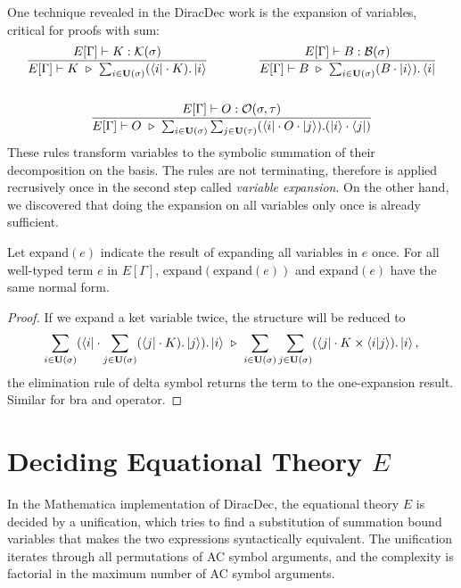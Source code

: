 \documentclass[runningheads]{llncs}
\begin{document}
One technique revealed in the DiracDec work is the expansion of variables, critical for proofs with sum:
\begin{gather*}
    \frac{E[\Gamma] \vdash K : \KType(\sigma)}{E[\Gamma] \vdash K \ \reduce\ \sum_{i \in \mathbf{U}(\sigma)}(\bra{i}\cdot K).\ket{i}}
    \qquad \qquad
    \frac{E[\Gamma] \vdash B : \BType(\sigma)}{E[\Gamma] \vdash B \ \reduce\ \sum_{i \in \mathbf{U}(\sigma)}(B \cdot \ket{i}).\bra{i}} \\
    \\
    \frac{E[\Gamma] \vdash O : \OType(\sigma, \tau)}{E[\Gamma] \vdash O \ \reduce\ \sum_{i \in \mathbf{U}(\sigma)} \sum_{j \in \mathbf{U}(\tau)}(\bra{i} \cdot O \cdot \ket{j}).(\ket{i} \cdot \bra{j})}
\end{gather*}
These rules transform variables to the symbolic summation of their decomposition on the basis.
The rules are not terminating, therefore is applied recrusively once in the second step called \textit{variable expansion}. On the other hand, we discovered that doing the expansion on all variables only once is already sufficient.
\begin{lemma}
    Let $\textrm{expand}(e)$ indicate the result of expanding all variables in $e$ once.
    For all well-typed term $e$ in $E[\Gamma]$, $\textrm{expand}(\textrm{expand}(e))$ and $\textrm{expand}(e)$ have the same normal form.
\end{lemma}
\begin{proof}
    If we expand a ket variable twice, the structure will be reduced to
    \[
        \sum_{i \in \mathbf{U}(\sigma)}(\bra{i}\cdot \sum_{j \in \mathbf{U}(\sigma)}(\bra{j}\cdot K).\ket{j}).\ket{i}
        \ \reduce\ 
        \sum_{i \in \mathbf{U}(\sigma)}\sum_{j \in \mathbf{U}(\sigma)}(\bra{j}\cdot K \times \braket{i|j}).\ket{i},
    \]
    the elimination rule of delta symbol returns the term to the one-expansion result. Similar for bra and operator.
\end{proof}



\section{Deciding Equational Theory $E$}

In the Mathematica implementation of DiracDec, the equational theory $E$ is decided by a unification, which tries to find a substitution of summation bound variables that makes the two expressions syntactically equivalent. The unification iterates through all permutations of AC symbol arguments, and the complexity is factorial in the maximum number of AC symbol arguments.
\end{document}
